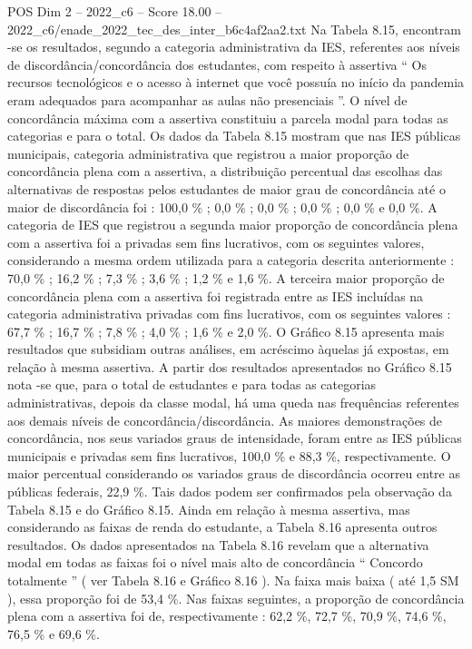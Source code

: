\begin{textsample}{POS Dim 2 – 2022\_c6 – Score 18.00 – 2022\_c6/enade\_2022\_tec\_des\_inter\_b6c4af2aa2.txt}
Na Tabela 8.15, encontram -se os resultados, segundo a categoria administrativa da IES, referentes aos níveis de discordância/concordância dos estudantes, com respeito à assertiva “ Os recursos tecnológicos e o acesso à internet que você possuía no início da pandemia eram adequados para acompanhar as aulas não presenciais ”.
O nível de concordância máxima com a assertiva constituiu a parcela modal para todas as categorias e para o total.
Os dados da Tabela 8.15 mostram que nas IES públicas municipais, categoria administrativa que registrou a maior proporção de concordância plena com a assertiva, a distribuição percentual das escolhas das alternativas de respostas pelos estudantes de maior grau de concordância até o maior de discordância foi : 100,0 \% ; 0,0 \% ; 0,0 \% ; 0,0 \% ; 0,0 \% e 0,0 \%.
A categoria de IES que registrou a segunda maior proporção de concordância plena com a assertiva foi a privadas sem fins lucrativos, com os seguintes valores, considerando a mesma ordem utilizada para a categoria descrita anteriormente : 70,0 \% ; 16,2 \% ; 7,3 \% ; 3,6 \% ; 1,2 \% e 1,6 \%.
A terceira maior proporção de concordância plena com a assertiva foi registrada entre as IES incluídas na categoria administrativa privadas com fins lucrativos, com os seguintes valores : 67,7 \% ; 16,7 \% ; 7,8 \% ; 4,0 \% ; 1,6 \% e 2,0 \%.
O Gráfico 8.15 apresenta mais resultados que subsidiam outras análises, em acréscimo àquelas já expostas, em relação à mesma assertiva.
A partir dos resultados apresentados no Gráfico 8.15 nota -se que, para o total de estudantes e para todas as categorias administrativas, depois da classe modal, há uma queda nas frequências referentes aos demais níveis de concordância/discordância.
As maiores demonstrações de concordância, nos seus variados graus de intensidade, foram entre as IES públicas municipais e privadas sem fins lucrativos, 100,0 \% e 88,3 \%, respectivamente.
O maior percentual considerando os variados graus de discordância ocorreu entre as públicas federais, 22,9 \%.
Tais dados podem ser confirmados pela observação da Tabela 8.15 e do Gráfico 8.15.
Ainda em relação à mesma assertiva, mas considerando as faixas de renda do estudante, a Tabela 8.16 apresenta outros resultados.
Os dados apresentados na Tabela 8.16 revelam que a alternativa modal em todas as faixas foi o nível mais alto de concordância “ Concordo totalmente ” ( ver Tabela 8.16 e Gráfico 8.16 ).
Na faixa mais baixa ( até 1,5 SM ), essa proporção foi de 53,4 \%.
Nas faixas seguintes, a proporção de concordância plena com a assertiva foi de, respectivamente : 62,2 \%, 72,7 \%, 70,9 \%, 74,6 \%, 76,5 \% e 69,6 \%.

\end{textsample}
